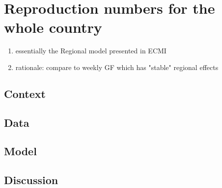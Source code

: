 \section{Reproduction numbers for the whole country}%
\label{sec:spatial_reproduction_number_model}

\begin{enumerate}
    \item essentially the Regional model presented in ECMI
    \item rationale: compare to weekly GF which has "stable" regional effects
\end{enumerate}


\subsection{Context}
\subsection{Data}
\subsection{Model}
\subsection{Discussion}